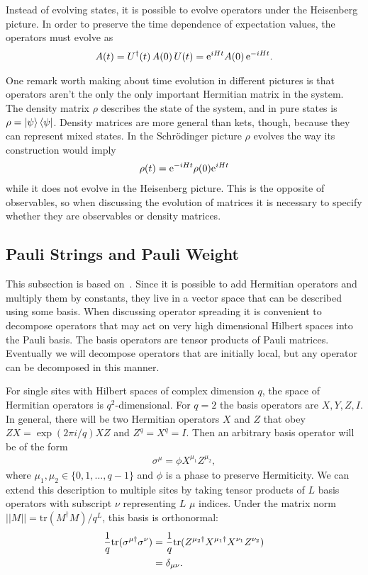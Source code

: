Instead of evolving states, it is possible to evolve operators under the Heisenberg picture. In order to preserve the time dependence of expectation values, the operators must evolve as 
\begin{align}
A(t) = U^\dag(t)\,A(0)\,U(t) = \text{e}^{iHt}A(0)\,\text{e}^{-iHt}.\label{eqn:heis}
\end{align}

One remark worth making about time evolution in different pictures is that operators aren't the only the only important Hermitian matrix in the system. The density matrix $\rho$ describes the state of the system, and in pure states is $\rho = \left|\psi\right\rangle\left\langle\psi\right|$. Density matrices are more general than kets, though, because they can represent mixed states. In the Schr\"odinger picture $\rho$ evolves the way its construction would imply
\begin{align}
\rho(t) = \text{e}^{-iHt}\rho(0)\text{e}^{iHt}
\end{align}
while it does not evolve in the Heisenberg picture. This is the opposite of observables, so when discussing the evolution of matrices it is necessary to specify whether they are observables or density matrices.

\subsection{Pauli Strings and Pauli Weight} \label{sub:pauli}

This subsection is based on~\cite{Keyserlingk}. Since it is possible to add Hermitian operators and multiply them by constants, they live in a vector space that can be described using some basis. When discussing operator spreading it is convenient to decompose operators that may act on very high dimensional Hilbert spaces into the Pauli basis. The basis operators are tensor products of Pauli matrices. Eventually we will decompose operators that are initially local, but any operator can be decomposed in this manner.

For single sites with Hilbert spaces of complex dimension $q$, the space of Hermitian operators is $q^2$-dimensional. For $q=2$ the basis operators are $X, Y, Z, I$. In general, there will be two Hermitian operators $X$ and $Z$ that obey $ZX = \exp(2\pi i/q)XZ$ and $Z^q=X^q=I$. Then an arbitrary basis operator will be of the form 
\begin{align}
\sigma^\mu = \phi X^{\mu_1}Z^{\mu_2},
\end{align}
where $\mu_1, \mu_2\in\{0,1,\dots,q-1\}$ and $\phi$ is a phase to preserve Hermiticity. We can extend this description to multiple sites by taking tensor products of $L$ basis operators with subscript $\nu$ representing $L$ $\mu$ indices. Under the matrix norm $||M|| = \text{tr}(M^\dag M)/q^L$, this basis is orthonormal:
\begin{align}
\frac{1}{q}\text{tr}(\sigma^{\mu\dag}\sigma^\nu) &= \frac{1}{q}\text{tr}(Z^{\mu_2\dag}
	X^{\mu_1\dag}X^{\nu_1}Z^{\nu_2})\nonumber\\
&= \delta_{\mu\nu}.\label{eqn:orthonorm}
\end{align}

